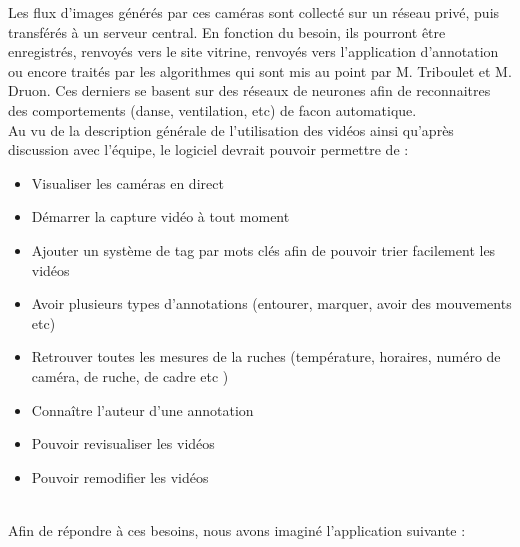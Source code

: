 \documentclass[11pt,french,a4paper]{report}
\begin{document}
  Les flux d'images générés par ces caméras sont collecté sur un réseau privé,
  puis transférés à un serveur central. En fonction du besoin, ils pourront
  être enregistrés, renvoyés vers le site vitrine, renvoyés vers l'application d'annotation
  ou encore traités par les algorithmes qui sont mis au point par M. Triboulet et M. Druon. 
  Ces derniers se basent sur des réseaux de neurones afin de reconnaitres des comportements
  (danse, ventilation, etc) de facon automatique. \\

Au vu de la description générale de l'utilisation des vidéos ainsi qu'après discussion avec l'équipe, le logiciel devrait 
pouvoir permettre de : \\
\begin{itemize}[itemsep=0cm,topsep=0cm]
    \item Visualiser les caméras en direct
    \item Démarrer la capture vidéo à tout moment 
    \item Ajouter un système de tag par mots clés afin de pouvoir trier facilement les vidéos 
    \item Avoir plusieurs types d'annotations (entourer, marquer, avoir des mouvements etc) 
    \item Retrouver toutes les mesures de la ruches (température, horaires, numéro de caméra, de ruche, de cadre etc )  
    \item Connaître l'auteur d'une annotation 
    \item Pouvoir revisualiser les vidéos 
    \item Pouvoir remodifier les vidéos 
\end{itemize} \\
Afin de répondre à ces besoins, nous avons imaginé l'application suivante : 
\end{document}
